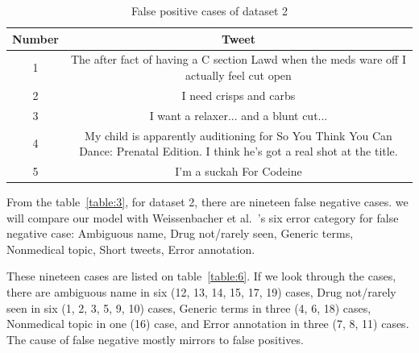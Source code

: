 \begin{table}[h!]
	\centering
	\begin{tabular}{||c c||} 
		\hline
		Number & Tweet \\ [0.5ex] 
		\hline\hline
		1 & The after fact of having a C section Lawd when the meds ware off I actually feel cut open \\ \hline
		2 & I need crisps and carbs \\ \hline
		3 & I want a relaxer... and a blunt cut... \\ \hline
		4 & My child is apparently auditioning for So You Think You Can Dance: Prenatal Edition. I think he's got a real shot at the title. \\ \hline
		5 & I'm a suckah For Codeine \\ \hline
	\end{tabular}
	\caption{False positive cases of dataset 2}
	\label{table:5}
\end{table}

From the table~\ref{table:3}, for dataset 2, there are nineteen false negative cases. we will compare our model with Weissenbacher et al.~\cite{weissenbacher2019deep}'s six error category for false negative case: Ambiguous name, Drug not/rarely seen, Generic terms, Nonmedical topic, Short tweets, Error annotation.

These nineteen cases are listed on table~\ref{table:6}. If we look through the cases, there are ambiguous name in six (12, 13, 14, 15, 17, 19) cases, Drug not/rarely seen in six (1, 2, 3, 5, 9, 10) cases, Generic terms in three (4, 6, 18) cases, Nonmedical topic in one (16) case, and Error annotation in three (7, 8, 11) cases. The cause of false negative mostly mirrors to false positives.
 
